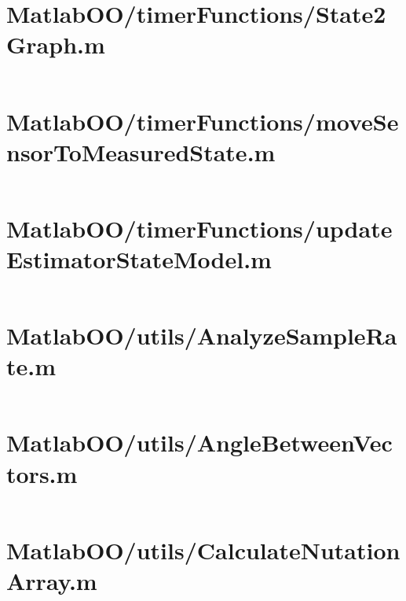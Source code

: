 \pagebreak
\section{MatlabOO/timerFunctions/State2Graph.m}\label{code:MatlabOO/timerFunctions/State2Graph.m}
\inputminted[linenos,fontsize=\scriptsize]{matlab}{/home/dcouture/git/mathyourlife/TSatPy/beta_versions/matlab_object_oriented/timerFunctions/State2Graph.m}

\pagebreak
\section{MatlabOO/timerFunctions/moveSensorToMeasuredState.m}\label{code:MatlabOO/timerFunctions/moveSensorToMeasuredState.m}
\inputminted[linenos,fontsize=\scriptsize]{matlab}{/home/dcouture/git/mathyourlife/TSatPy/beta_versions/matlab_object_oriented/timerFunctions/moveSensorToMeasuredState.m}

\pagebreak
\section{MatlabOO/timerFunctions/updateEstimatorStateModel.m}\label{code:MatlabOO/timerFunctions/updateEstimatorStateModel.m}
\inputminted[linenos,fontsize=\scriptsize]{matlab}{/home/dcouture/git/mathyourlife/TSatPy/beta_versions/matlab_object_oriented/timerFunctions/updateEstimatorStateModel.m}

\pagebreak
\section{MatlabOO/utils/AnalyzeSampleRate.m}\label{code:MatlabOO/utils/AnalyzeSampleRate.m}
\inputminted[linenos,fontsize=\scriptsize]{matlab}{/home/dcouture/git/mathyourlife/TSatPy/beta_versions/matlab_object_oriented/utils/AnalyzeSampleRate.m}

\pagebreak
\section{MatlabOO/utils/AngleBetweenVectors.m}\label{code:MatlabOO/utils/AngleBetweenVectors.m}
\inputminted[linenos,fontsize=\scriptsize]{matlab}{/home/dcouture/git/mathyourlife/TSatPy/beta_versions/matlab_object_oriented/utils/AngleBetweenVectors.m}

\pagebreak
\section{MatlabOO/utils/CalculateNutationArray.m}\label{code:MatlabOO/utils/CalculateNutationArray.m}
\inputminted[linenos,fontsize=\scriptsize]{matlab}{/home/dcouture/git/mathyourlife/TSatPy/beta_versions/matlab_object_oriented/utils/CalculateNutationArray.m}

